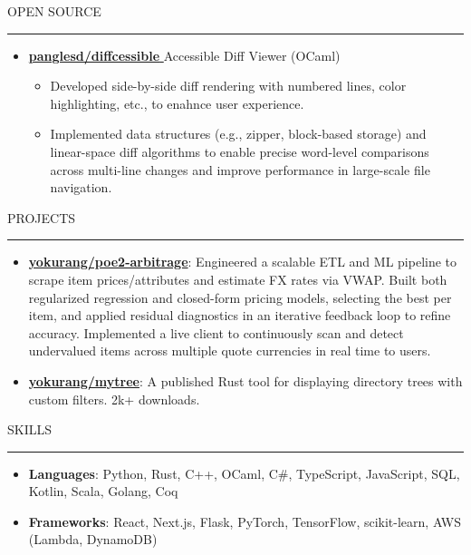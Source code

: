 \documentclass[letterpaper, 11pt]{article}
\def\sectionlineskip{\medskip}
\def\sectionskip{\medskip}
\def \entryspacing {-0pt}
\newcommand{\SectionHeading}[1]{
  \sectionskip
  \raggedright\raggedbottom\MakeUppercase{\large{#1}}
  \sectionlineskip
  \hrule
  \color{black}
}
\newcommand{\ResumeItem}[2]{
  \item{
    \textbf{#1}{: #2 \vspace{-2.835pt}}
  }
}
\newcommand{\ResumeItemDefault}[1]{
  \item{
    #1 \vspace{-2.835pt}
  }
}
\newcommand{\ResumeProjectItem}[3]{
  \item{
    \href{#2}{\textbf{#1}}{: #3 \vspace{-2.835pt}}
  }
}
\newcommand{\ResumeEntryStart}{\begin{itemize}[leftmargin=0mm, label={}]}
\newcommand{\ResumeEntryEnd}{\end{itemize}\vspace{-2.835pt}} %
\newcommand{\ResumeItemListStart}{\begin{itemize}[leftmargin=5mm, label=$\bullet$, itemsep=1mm, parsep=1mm]} %
\newcommand{\ResumeItemListEnd}{\end{itemize}}
\newcommand{\ProjectItemListStart}{\begin{itemize}[leftmargin=*, label=$\bullet$]}
\newcommand{\ProjectItemListEnd}{\end{itemize}\vspace{\entryspacing}}
\newcommand{\OpenSourceProjectItem}[3]{
  \item{
    \href{#1}{\textbf{#2} }\hfill{#3}\vspace{-2.835pt}
  }
}
\begin{document}
  \SectionHeading{Open Source}
    \ResumeEntryStart
    \OpenSourceProjectItem{https://github.com/panglesd/diffcessible}{panglesd/diffcessible}{Accessible Diff Viewer (OCaml)}
    \ResumeItemListStart
      \ResumeItemDefault{Developed side-by-side diff rendering with numbered lines, color highlighting, etc., to enahnce user experience.}

      \ResumeItemDefault{Implemented data structures (e.g., zipper, block-based storage) and linear-space diff algorithms to enable precise word-level comparisons across multi-line changes and improve performance in large-scale file navigation.}

    \ResumeItemListEnd
  \ResumeEntryEnd

  \SectionHeading{Projects}
  \ProjectItemListStart
  
    \ResumeProjectItem{yokurang/poe2-arbitrage}
    {https://github.com/yokurang/path-of-elixe}
    {Engineered a scalable ETL and ML pipeline to scrape item prices/attributes and estimate FX rates via VWAP. Built both regularized regression and closed-form pricing models, selecting the best per item, and applied residual diagnostics in an iterative feedback loop to refine accuracy. Implemented a live client to continuously scan and detect undervalued items across multiple quote currencies in real time to users.}

    \ResumeProjectItem{yokurang/mytree}
    {https://github.com/yokurang/mytree}
    {A published Rust tool for displaying directory trees with custom filters. 2k+ downloads.}

  \ProjectItemListEnd

  \SectionHeading{Skills}
  \ResumeEntryStart
    \ResumeItem{Languages}{ Python, Rust, C++, OCaml, C\#, TypeScript, JavaScript, SQL, Kotlin, Scala, Golang, Coq }
    \ResumeItem{Frameworks}{ React, Next.js, Flask, PyTorch, TensorFlow, scikit-learn, AWS (Lambda, DynamoDB) }
  \ResumeEntryEnd
\end{document}
